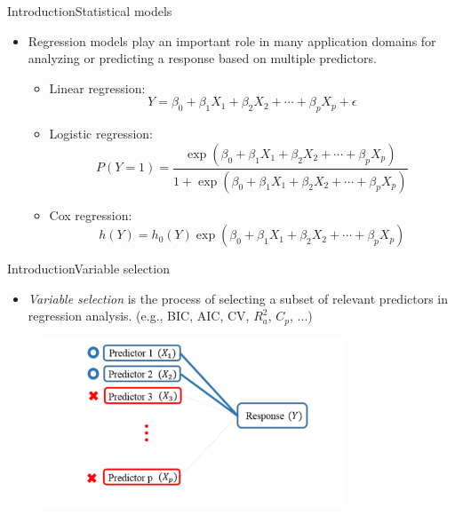 \documentclass[citecolor=blue,10pt]{beamer}
\newcommand{\0} {\mbox{\boldmath$0$}}
\begin{document}
\begin{frame}{Introduction}{Statistical models}
\begin{itemize}
\item Regression models play an important role in many application domains for analyzing or predicting a response based on multiple predictors.
\vspace{5mm}

\begin{itemize}
\item Linear regression:
$$Y=\beta_0+\beta_1 X_1+\beta_2 X_2+\cdots +\beta_p X_p +\epsilon$$
\item Logistic regression:
$$P(Y=1)=\frac{\exp(\beta_0+\beta_1 X_1+\beta_2 X_2+\cdots +\beta_p X_p)}{1+\exp(\beta_0+\beta_1 X_1+\beta_2 X_2+\cdots +\beta_p X_p)} $$
\item Cox regression:
$$h(Y)= h_0(Y)\exp(\beta_0+\beta_1 X_1+\beta_2 X_2+\cdots +\beta_p X_p)$$
\end{itemize}
\end{itemize}

\end{frame}


\begin{frame}{Introduction}{Variable selection}
\begin{itemize}
\item \emph{Variable selection} is the process of selecting a subset of relevant predictors in regression analysis. (e.g., BIC, AIC, CV, $R^2_a$, $C_p$, ...)
\end{itemize}
\begin{figure}
\includegraphics[width=0.8\textwidth]{Figure1.pdf}
\end{figure}
\end{frame}
\end{document}
